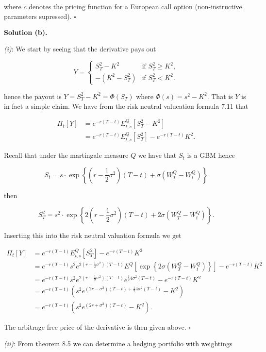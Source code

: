 \documentclass[
]{article}
\begin{document}
where \(c\) denotes the pricing function for a European call option
(non-instructive parameters supressed). \(\square\)

\textbf{Solution (b).}

\emph{(i)}: We start by seeing that the derivative pays out

\[
Y=
\begin{cases}
  S_T^2-K^2 & \text{if }S_T^2\ge K^2,\\
  -(K^2-S_T^2) &\text{if }S_T^2< K^2.
\end{cases}
\]

hence the payout is \(Y=S_T^2-K^2=\Phi(S_T)\) where \(\Phi(s)=s^2-K^2\).
That is \(Y\) is in fact a simple claim. We have from the risk neutral
valueation formula 7.11 that

\begin{align*}
\Pi_t[Y]&=e^{-r(T-t)}E^Q_{t,s}[S_T^2-K^2]\\
&=e^{-r(T-t)}E^Q_{t,s}[S_T^2]-e^{-r(T-t)}K^2.
\end{align*}

Recall that under the martingale measure \(Q\) we have that \(S_t\) is a
GBM hence

\[
S_t=s\cdot \exp\left\{\left(r-\frac{1}{2}\sigma^2\right)(T-t)+\sigma\left(W_T^Q-W_t^Q\right)\right\}
\]

then

\[
S_T^2=s^2\cdot \exp\left\{2\left(r-\frac{1}{2}\sigma^2\right)(T-t)+2\sigma\left(W_T^Q-W_t^Q\right)\right\}.
\]

Inserting this into the risk neutral valuation formula we get

\begin{align*}
\Pi_t[Y]&=e^{-r(T-t)}E^Q_{t,s}[S_T^2]-e^{-r(T-t)}K^2\\
&=e^{-r(T-t)}s^2e^{2\left(r-\frac{1}{2}\sigma^2\right)(T-t)} E^Q\left[\exp\left\{2\sigma\left(W_T^Q-W_t^Q\right)\right\}\right]-e^{-r(T-t)}K^2\\
&=e^{-r(T-t)}s^2e^{2\left(r-\frac{1}{2}\sigma^2\right)(T-t)}e^{\frac{1}{2}4\sigma^2(T-t)}-e^{-r(T-t)}K^2\\
&=e^{-r(T-t)}\left(s^2e^{(2r-\sigma^2)(T-t)+\frac{1}{2}4\sigma^2(T-t)}-K^2\right)\\
&=e^{-r(T-t)}\left(s^2e^{(2r+\sigma^2)(T-t)}-K^2\right).
\end{align*}

The arbitrage free price of the derivative is then given above.
\(\square\)

\emph{(ii)}: From theorem 8.5 we can determine a hedging portfolio with
weightings
\end{document}
